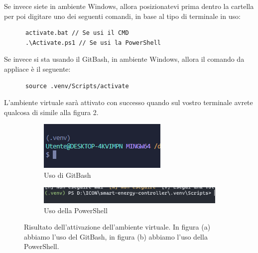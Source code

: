 \documentclass[12pt, letterpaper]{article}
\begin{document}
\begin{appendices}
      \noindent Se invece siete in ambiente Windows, allora posizionatevi prima dentro la cartella
       per poi  digitare uno dei seguenti comandi, in base al tipo di terminale in uso:

      \begin{verbatim}
      activate.bat // Se usi il CMD
      .\Activate.ps1 // Se usi la PowerShell
\end{verbatim}

      \noindent Se invece si sta usando il GitBash, in ambiente Windows, allora il comando da appliace è il seguente:

      \begin{verbatim}
      source .venv/Scripts/activate
\end{verbatim}

      \noindent L'ambiente virtuale sarà attivato con successo quando sul vostro terminale avrete
      qualcosa di simile alla figura 2.

      \begin{figure}[h]
            \centering

            \vspace{0.2cm}

            \begin{subfigure}{1\textwidth}
                  \centering
                  \includegraphics{terminale-bash.png}
                  \caption{Uso di GitBash}
            \end{subfigure}

            \vspace{0.3cm}


            \begin{subfigure}{1\textwidth}
                  \centering
                  \includegraphics[scale=0.8]{terminale-powershell.png}
                  \caption{Uso della PowerShell}
            \end{subfigure}

            \caption{
                  Risultato dell'attivazione dell'ambiente virtuale. In figura (a) abbiamo
                  l'uso del GitBash, in figura (b) abbiamo l'uso della PowerShell.
            }
      \end{figure} \break


\end{appendices}
\end{document}
